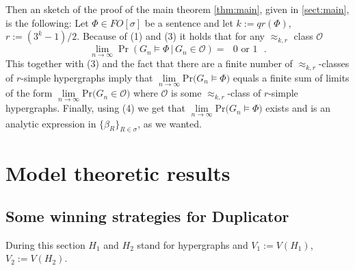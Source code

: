 \documentclass[12pt,notitlepage,a4paper]{article}
\theoremstyle{definition}
\newcommand{\Ln}{\lim\limits_{n\to \infty}}
\newcommand{\PR}[1]{\mathrm{Pr}\big(#1\big)}
\begin{document}
Then an sketch of the proof of the main theorem \cref{thm:main}, given in \cref{sect:main},
 is the following:
Let $\Phi\in FO[\sigma]$ be a sentence and let $k:=qr(\Phi)$, $r:=(3^k-1)/2$.
Because of (1) and (3) it holds that for any $\approx_{k,r}$ class $\mathcal{O}$
\[
\Ln \Pr\left(G_n \models \Phi\, \big| \, G_n\in \mathcal{O} \right)= \text{ $0$ or $1$ }.
\]
This together with (3) and the fact that there are a finite number of
$\approx_{k,r}$-classes of $r$-simple hypergraphs imply that $\Ln \PR{G_n \models \Phi}$
equals a finite sum of limits of the form $\Ln \PR{G_n \in \mathcal{O}}$
where $\mathcal{O}$ is some $\approx_{k,r}$-class of $r$-simple hypergraphs.
Finally, using (4) we get that $\Ln \PR{G_n \models \Phi}$ exists and 
is an analytic expression in $\{\beta_R\}_{R\in \sigma}$, as we wanted. 
%
%
%

\section{Model theoretic results}

\subsection{Some winning strategies for Duplicator}

During this section $H_1$ and $H_2$ stand for
hypergraphs and $V_1:=V(H_1)$, $V_2:=V(H_2)$.
\end{document}
